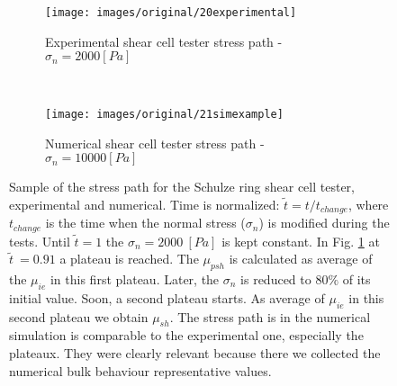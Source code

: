 \begin{figure}[htp] \centering
    \begin{subfigure}[b]{0.96\columnwidth}
        \texttt{[image: images/original/20experimental]}
        \caption{Experimental shear cell tester stress path - $\sigma_n = 2000
        [Pa]$}
        \label{fig:20experimental} 
    \end{subfigure}\\
        \begin{subfigure}[b]{0.96\columnwidth}
        \texttt{[image: images/original/21simexample]}
        \caption{Numerical shear cell tester stress path - $\sigma_n = 10000
        [Pa]$}
        \label{fig:21simexample} 
    \end{subfigure}
    \caption[Stress path]{Sample of the stress path for
	the Schulze ring shear cell tester, experimental and numerical.
	Time is normalized: $\tilde{t} = t/t_{change}$, where $t_{change}$ is the
	time when the normal stress ($\sigma_n$) is modified during the tests.
	Until $\tilde{t}=1$ the $\sigma_n = 2000 ~[Pa]$ is kept constant. 
	In Fig. \ref{fig:20experimental} at $\tilde{t}~=0.91$
 	a plateau is reached.
	The $\mu_{psh}$ is calculated as average of the $\mu_{ie}$ in this first
	plateau.
	Later, the $\sigma_n$ is reduced to $80 \%$ of its initial value.
	Soon, a second plateau starts.
	As average of $\mu_{ie}$ in this second plateau we obtain $\mu_{sh}$.
	The stress path is in the numerical simulation is comparable to the
	experimental one, especially the plateaux.
	They were clearly relevant because there we collected the numerical bulk
	behaviour representative values. }
    \label{fig:40experimentalsimulation}
\end{figure}
